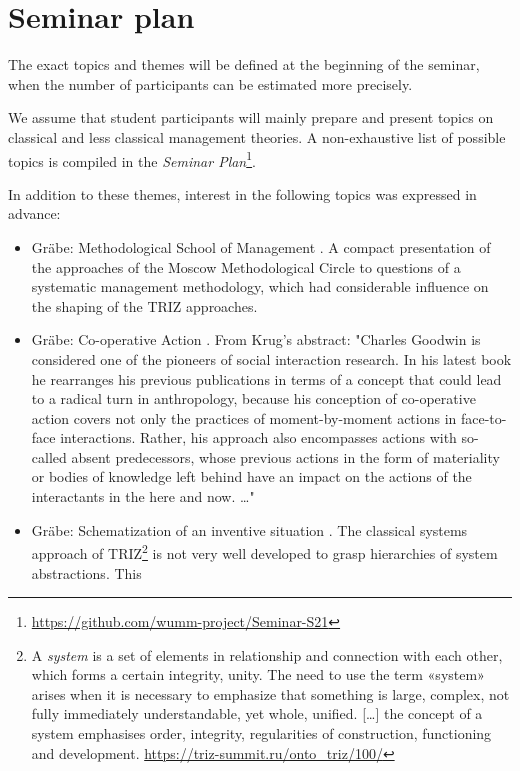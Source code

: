 \documentclass[11pt,a4paper]{article}
\begin{document}
\section{Seminar plan}

The exact topics and themes will be defined at the beginning of the seminar,
when the number of participants can be estimated more precisely.

We assume that student participants will mainly prepare and present topics on
classical and less classical management theories. A non-exhaustive list of
possible topics is compiled in the \emph{Seminar
  Plan}\footnote{\url{https://github.com/wumm-project/Seminar-S21}}.

In addition to these themes, interest in the following topics was expressed in
advance:
\begin{itemize}
\item Gr\"abe: Methodological School of Management \cite{Khristenko2014,
  Shchedrovitsky1981}.  A compact presentation of the approaches of the Moscow
  Methodological Circle to questions of a systematic management methodology,
  which had considerable influence on the shaping of the TRIZ approaches.
\item Gr\"abe: Co-operative Action \cite{Goodwin2018, Krug2019}. From Krug's
  abstract: "Charles Goodwin is considered one of the pioneers of social
  interaction research. In his latest book he rearranges his previous
  publications in terms of a concept that could lead to a radical turn in
  anthropology, because his conception of co-operative action covers not only
  the practices of moment-by-moment actions in face-to-face interactions.
  Rather, his approach also encompasses actions with so-called absent
  predecessors, whose previous actions in the form of materiality or bodies of
  knowledge left behind have an impact on the actions of the interactants in
  the here and now. \ldots"
\item Gr\"abe: Schematization of an inventive situation \cite{Kozhemyako2019}.
  The classical systems approach of TRIZ\footnote{A \emph{system} is a set of
    elements in relationship and connection with each other, which forms a
    certain integrity, unity. The need to use the term «system» arises when it
    is necessary to emphasize that something is large, complex, not fully
    immediately understandable, yet whole, unified. [\ldots] the concept of a
    system emphasises order, integrity, regularities of construction,
    functioning and development.  \url{https://triz-summit.ru/onto_triz/100/}}
  is not very well developed to grasp hierarchies of system abstractions. This

\end{itemize}
\end{document}
